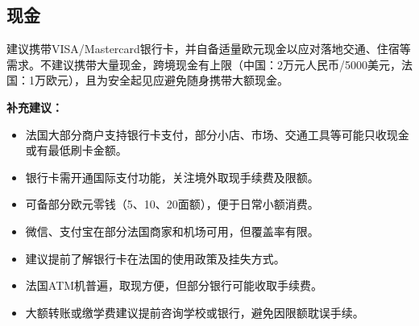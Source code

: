 \subsection{现金}

建议携带VISA/Mastercard银行卡，并自备适量欧元现金以应对落地交通、住宿等需求。不建议携带大量现金，跨境现金有上限（中国：2万元人民币/5000美元，法国：1万欧元），且为安全起见应避免随身携带大额现金。

\textbf{补充建议：}
\begin{itemize}
    \item 法国大部分商户支持银行卡支付，部分小店、市场、交通工具等可能只收现金或有最低刷卡金额。
    \item 银行卡需开通国际支付功能，关注境外取现手续费及限额。
    \item 可备部分欧元零钱（5、10、20面额），便于日常小额消费。
    \item 微信、支付宝在部分法国商家和机场可用，但覆盖率有限。
    \item 建议提前了解银行卡在法国的使用政策及挂失方式。
    \item 法国ATM机普遍，取现方便，但部分银行可能收取手续费。
    \item 大额转账或缴学费建议提前咨询学校或银行，避免因限额耽误手续。
\end{itemize}
